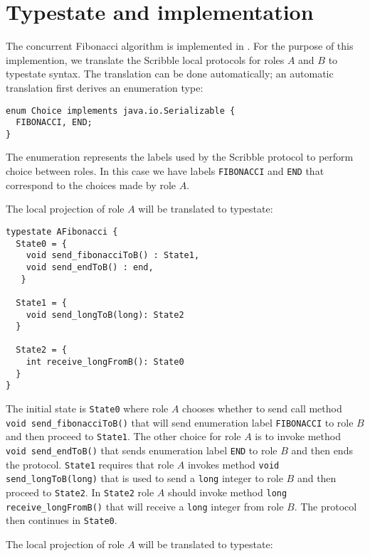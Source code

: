 \section{Typestate and \Mungo implementation}

The concurrent Fibonacci algorithm is implemented in \Mungo.
For the purpose of this implemention,
we translate the Scribble local protocols for roles
$A$ and $B$ to \Mungo typestate syntax.
The translation can be done automatically;
an automatic translation first derives an
enumeration type:

\begin{lstlisting}[caption={Enumeration for the communication choice}]
enum Choice implements java.io.Serializable {
  FIBONACCI, END;
}
\end{lstlisting}

The enumeration represents the
labels used by the Scribble protocol
to perform choice between roles. In this
case we have labels \lstinline|FIBONACCI| and
\lstinline|END| that correspond to the choices
made by role $A$.

The local projection of role $A$ will be translated to typestate:

\begin{lstlisting}[caption={Typestate for Role A}]
typestate AFibonacci {
  State0 = {
    void send_fibonacciToB() : State1,
    void send_endToB() : end,
   }

  State1 = {
    void send_longToB(long): State2
  }

  State2 = {
    int receive_longFromB(): State0
  }
}
\end{lstlisting}

The initial state is \lstinline|State0| where
role $A$ chooses whether to send call method
\lstinline|void send_fibonacciToB()| that
will send enumeration label \lstinline|FIBONACCI| to role $B$
and then proceed to \lstinline|State1|. The other
choice for role $A$ is to invoke method
\lstinline|void send_endToB()| that sends
enumeration label \lstinline|END| to role $B$
and then ends the protocol.
\lstinline|State1| requires that role $A$ invokes
method \lstinline|void send_longToB(long)| that
is used to send a \lstinline|long| integer to role
$B$ and then proceed to \lstinline|State2|. In 
\lstinline|State2| role $A$ should invoke method
\lstinline|long receive_longFromB()| that will
receive a \lstinline|long| integer from role $B$.
The protocol then continues in \lstinline|State0|.


The local projection of role $A$ will be translated to typestate:

